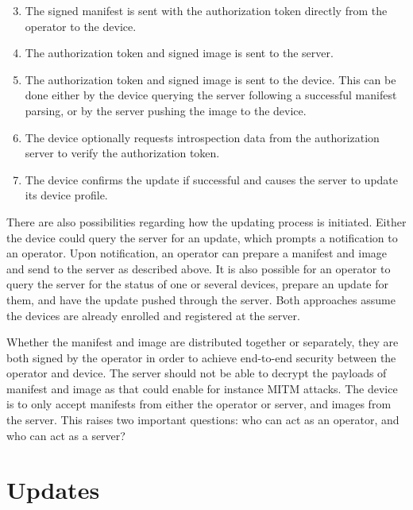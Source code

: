 \documentclass[0-thesis.tex]{subfiles}
\begin{document}
\begin{enumerate}[label=1.\arabic*]
    \setcounter{enumi}{2}
    \item The signed manifest is sent with the authorization token directly from the
            operator to the device.
    \item The authorization token and signed image is sent to the server.
    \item The authorization token and signed image is sent to the device. This can be done
            either by the device querying the server following a successful manifest parsing,
            or by the server pushing the image to the device.
    \item The device optionally requests introspection data from the authorization server
            to verify the authorization token.
    \item The device confirms the update if successful and causes the server to update
            its device profile.
\end{enumerate}

There are also possibilities regarding how the updating process is initiated. Either the
device could query the server for an update, which prompts a notification to an operator.
Upon notification, an operator can prepare a manifest and image and send to the server as
described above. It is also possible for an operator to query the server for the status of
one or several devices, prepare an update for them, and have the update pushed through the
server. Both approaches assume the devices are already enrolled and registered at the
server.

Whether the manifest and image are distributed together or separately, they are both
signed by the operator in order to achieve end-to-end security between the operator and
device. The server should not be able to decrypt the payloads of manifest and image as
that could enable for instance MITM attacks. The device is to only accept manifests from
either the operator or server, and images from the server. This raises two important
questions: who can act as an operator, and who can act as a server?

\section{Updates}
\label{sec:updates}
\end{document}
